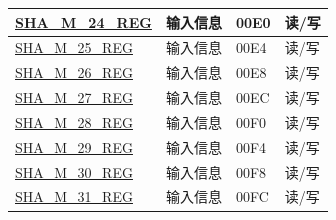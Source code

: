 \begin{longtable}{ | p{6cm} | p{7.2cm} | p{1.3cm} | p{1.5cm} | }
\hyperref[regdesc:SHAMNREG]{SHA\_M\_24\_REG} & 输入信息 & \hexprefix{}00E0 & 读/写 \\ \hline
\hyperref[regdesc:SHAMNREG]{SHA\_M\_25\_REG} & 输入信息 & \hexprefix{}00E4 & 读/写 \\ \hline
\hyperref[regdesc:SHAMNREG]{SHA\_M\_26\_REG} & 输入信息 & \hexprefix{}00E8 & 读/写 \\ \hline
\hyperref[regdesc:SHAMNREG]{SHA\_M\_27\_REG} & 输入信息 & \hexprefix{}00EC & 读/写 \\ \hline
\hyperref[regdesc:SHAMNREG]{SHA\_M\_28\_REG} & 输入信息 & \hexprefix{}00F0 & 读/写 \\ \hline
\hyperref[regdesc:SHAMNREG]{SHA\_M\_29\_REG} & 输入信息 & \hexprefix{}00F4 & 读/写 \\ \hline
\hyperref[regdesc:SHAMNREG]{SHA\_M\_30\_REG} & 输入信息 & \hexprefix{}00F8 & 读/写 \\ \hline
\hyperref[regdesc:SHAMNREG]{SHA\_M\_31\_REG} & 输入信息 & \hexprefix{}00FC & 读/写 \\ \hline
\end{longtable}
